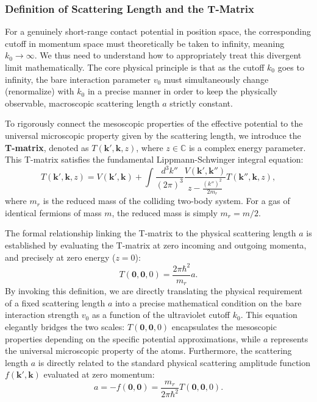 \subsubsection{Definition of Scattering Length and the T-Matrix}

For a genuinely short-range contact potential in position space, the corresponding cutoff in momentum space must theoretically be taken to infinity, meaning \( k_0 \to \infty \). We thus need to understand how to appropriately treat this divergent limit mathematically. The core physical principle is that as the cutoff \( k_0 \) goes to infinity, the bare interaction parameter \( v_0 \) must simultaneously change (renormalize) with \( k_0 \) in a precise manner in order to keep the physically observable, macroscopic scattering length \( a \) strictly constant.

To rigorously connect the mesoscopic properties of the effective potential to the universal microscopic property given by the scattering length, we introduce the \textbf{T-matrix}, denoted as \( T(\mathbf{k}', \mathbf{k}, z) \), where \( z \in \mathbb{C} \) is a complex energy parameter. This T-matrix satisfies the fundamental Lippmann-Schwinger integral equation:
\[
    T(\mathbf{k}', \mathbf{k}, z) = V(\mathbf{k}', \mathbf{k}) + \int \frac{d^3 k''}{(2\pi)^3} \frac{V(\mathbf{k}', \mathbf{k}'')}{z - \frac{(k'')^2}{2m_r}} T(\mathbf{k}'', \mathbf{k}, z),
\]
where \( m_r \) is the reduced mass of the colliding two-body system. For a gas of identical fermions of mass \( m \), the reduced mass is simply \( m_r = m/2 \).

The formal relationship linking the T-matrix to the physical scattering length \( a \) is established by evaluating the T-matrix at zero incoming and outgoing momenta, and precisely at zero energy (\( z = 0 \)):
\begin{equation} \label{eq:scattering_length_definition}
    T(\mathbf{0}, \mathbf{0}, 0) = \frac{2\pi\hbar^2}{m_r} a.
\end{equation}
By invoking this definition, we are directly translating the physical requirement of a fixed scattering length \( a \) into a precise mathematical condition on the bare interaction strength \( v_0 \) as a function of the ultraviolet cutoff \( k_0 \). This equation elegantly bridges the two scales: \( T(\mathbf{0}, \mathbf{0}, 0) \) encapsulates the mesoscopic properties depending on the specific potential approximations, while \( a \) represents the universal microscopic property of the atoms. Furthermore, the scattering length \( a \) is directly related to the standard physical scattering amplitude function \( f(\mathbf{k}', \mathbf{k}) \) evaluated at zero momentum:
\[
    a = -f(\mathbf{0}, \mathbf{0}) = \frac{m_r}{2\pi\hbar^2} T(\mathbf{0}, \mathbf{0}, 0).
\]

